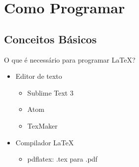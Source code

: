 \documentclass{beamer}
\begin{document}
\section{Como Programar}

\subsection{Conceitos Básicos}

\begin{frame}{O que é necessário para programar \LaTeX?}
    \begin{itemize}
        \item Editor de texto
        \begin{itemize}
            \item Sublime Text 3
            \item Atom
            \item TexMaker
        \end{itemize}
        \item Compilador \LaTeX~
        \begin{itemize}
            \item pdflatex: .tex para .pdf
        \end{itemize}
    \end{itemize}
\end{frame}
\end{document}
